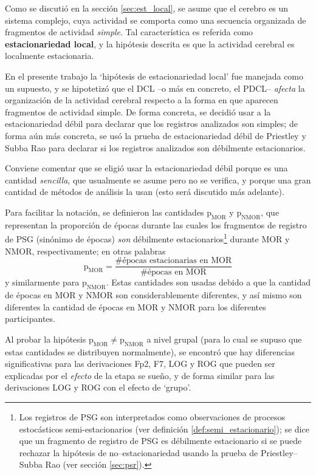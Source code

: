 \documentclass[12pt,letterpaper]{book}
\begin{document}
Como se discutió en la sección \ref{sec:est_local}, se asume que el cerebro es un sistema complejo, cuya actividad se comporta como una secuencia organizada de fragmentos de actividad \textit{simple}.
%
Tal característica es referida como \textbf{estacionariedad local}, y la hipótesis descrita es que la actividad cerebral es localmente estacionaria.

En el presente trabajo la `hipótesis de estacionariedad local' fue manejada como un supuesto, y se hipotetizó que el DCL --o más en concreto, el PDCL-- \textit{afecta} la organización de la actividad cerebral respecto a la forma en que aparecen fragmentos de actividad simple.
%
De forma concreta, se decidió usar a la estacionariedad débil para declarar que los registros analizados son simples; de forma aún más concreta, se usó la prueba de estacionariedad débil de Priestley y Subba Rao para declarar si los registros analizados son débilmente estacionarios.

Conviene comentar que se eligió usar la estacionariedad débil porque es una cantidad \textit{sencilla}, que usualmente se asume pero no se verifica, y porque una gran cantidad de métodos de análisis la usan (esto será discutido más adelante).

Para facilitar la notación, se definieron las cantidades $\text{p}_{\text{MOR}}$ y $\text{p}_{\text{NMOR}}$, que representan la proporción de épocas durante las cuales los fragmentos de registro de PSG (sinónimo de épocas) \textit{son} débilmente estacionarios\footnote{Los registros de PSG son interpretados como observaciones de procesos estocásticos semi-estacionarios (ver definición \ref{def:semi_estacionario}); se dice que un fragmento de registro de PSG es débilmente estacionario si se puede rechazar la hipótesis de no--estacionariedad usando la prueba de Priestley--Subba Rao (ver sección \ref{sec:psr}).} durante MOR y NMOR, respectivamente; en otras palabras
\begin{equation}
\text{p}_{\text{MOR}} = \frac{\text{\# épocas estacionarias en MOR}}{\text{\# épocas en MOR}}
\end{equation}
y similarmente para $\text{p}_{\text{NMOR}}$. 
%
Estas cantidades son usadas debido a que la cantidad de épocas en MOR y NMOR son considerablemente diferentes, y así mismo son diferentes la cantidad de épocas en MOR y NMOR para los diferentes participantes.

Al probar la hipótesis $\text{p}_{\text{MOR}} \neq \text{p}_{\text{NMOR}}$ a nivel grupal (para lo cual se supuso que estas cantidades se distribuyen normalmente), se  encontró que hay diferencias significativas para las derivaciones Fp2, F7, LOG y ROG que pueden ser explicadas por el \textit{efecto} de la etapa se sueño, y de forma similar para las derivaciones LOG y ROG con el efecto de `grupo'.
\end{document}
